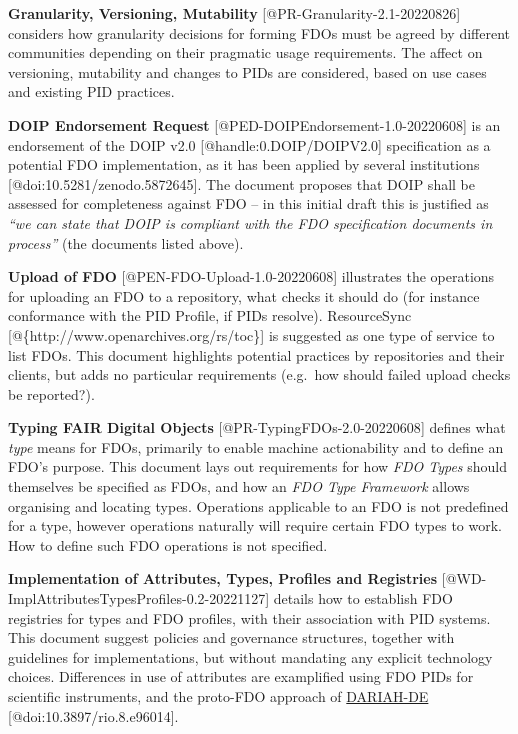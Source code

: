 \textbf{Granularity, Versioning, Mutability}
{[}@PR-Granularity-2.1-20220826{]} considers how granularity decisions
for forming FDOs must be agreed by different communities depending on
their pragmatic usage requirements. The affect on versioning, mutability
and changes to PIDs are considered, based on use cases and existing PID
practices.

\textbf{DOIP Endorsement Request}
{[}@PED-DOIPEndorsement-1.0-20220608{]} is an endorsement of the DOIP
v2.0 {[}@handle:0.DOIP/DOIPV2.0{]} specification as a potential FDO
implementation, as it has been applied by several institutions
{[}@doi:10.5281/zenodo.5872645{]}. The document proposes that DOIP shall
be assessed for completeness against FDO -- in this initial draft this
is justified as \emph{``we can state that DOIP is compliant with the FDO
specification documents in process''} (the documents listed above).

\textbf{Upload of FDO} {[}@PEN-FDO-Upload-1.0-20220608{]} illustrates
the operations for uploading an FDO to a repository, what checks it
should do (for instance conformance with the PID Profile, if PIDs
resolve). ResourceSync {[}@\{http://www.openarchives.org/rs/toc\}{]} is
suggested as one type of service to list FDOs. This document highlights
potential practices by repositories and their clients, but adds no
particular requirements (e.g.~how should failed upload checks be
reported?).

\textbf{Typing FAIR Digital Objects} {[}@PR-TypingFDOs-2.0-20220608{]}
defines what \emph{type} means for FDOs, primarily to enable machine
actionability and to define an FDO's purpose. This document lays out
requirements for how \emph{FDO Types} should themselves be specified as
FDOs, and how an \emph{FDO Type Framework} allows organising and
locating types. Operations applicable to an FDO is not predefined for a
type, however operations naturally will require certain FDO types to
work. How to define such FDO operations is not specified.

\textbf{Implementation of Attributes, Types, Profiles and Registries}
{[}@WD-ImplAttributesTypesProfiles-0.2-20221127{]} details how to
establish FDO registries for types and FDO profiles, with their
association with PID systems. This document suggest policies and
governance structures, together with guidelines for implementations, but
without mandating any explicit technology choices. Differences in use of
attributes are examplified using FDO PIDs for scientific instruments,
and the proto-FDO approach of \href{https://de.dariah.eu/}{DARIAH-DE}
{[}@doi:10.3897/rio.8.e96014{]}.

